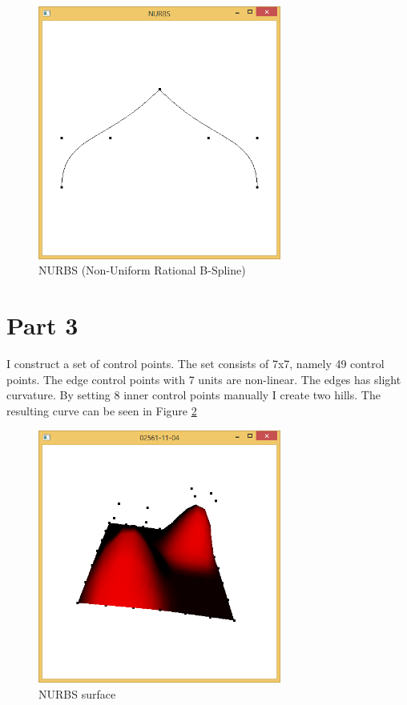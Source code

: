 \begin{figure}[hp]
\centering
\includegraphics[width=8cm]{../Screenshots/ex-11/3-5.png}
\caption{NURBS (Non-Uniform Rational B-Spline)}
\label{fig:11-3-5}
\end{figure}


\section{Part 3}

I construct a set of control points. The set consists of 7x7, namely 49 control points. The edge control points with 7 units are non-linear. The edges has slight curvature. By setting 8 inner control points manually I create two hills. The resulting curve can be seen in Figure \ref{fig:11-4}

\begin{figure}[hp]
\centering
\includegraphics[width=8cm]{../Screenshots/ex-11/4.png}
\caption{NURBS surface}
\label{fig:11-4}
\end{figure}